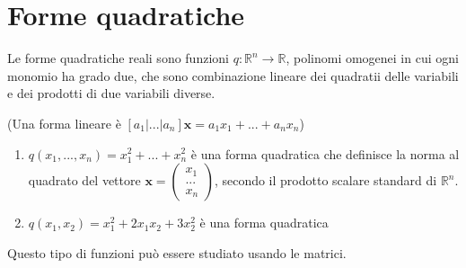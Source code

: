 \documentclass{article}
\begin{document}
\section{Forme quadratiche}

Le forme quadratiche reali sono funzioni $q:%
\mathbb{R}
^{n}\rightarrow 
\mathbb{R}
$, polinomi omogenei in cui ogni monomio ha grado due, che sono combinazione
lineare dei quadratii delle variabili e dei prodotti di due variabili
diverse.

(Una forma lineare \`{e} $\left[ a_{1}|...|a_{n}\right] \mathbf{x}%
=a_{1}x_{1}+...+a_{n}x_{n}$)

\begin{enumerate}
\item $q\left( x_{1},...,x_{n}\right) =x_{1}^{2}+...+x_{n}^{2}$ \`{e} una
forma quadratica che definisce la norma al quadrato del vettore $\mathbf{x}%
=\left( 
\begin{array}{c}
x_{1} \\ 
... \\ 
x_{n}%
\end{array}%
\right) $, secondo il prodotto scalare standard di $%
\mathbb{R}
^{n}$.

\item $q\left( x_{1},x_{2}\right) =x_{1}^{2}+2x_{1}x_{2}+3x_{2}^{2}$ \`{e}
una forma quadratica
\end{enumerate}

Questo tipo di funzioni pu\`{o} essere studiato usando le matrici.
\end{document}
